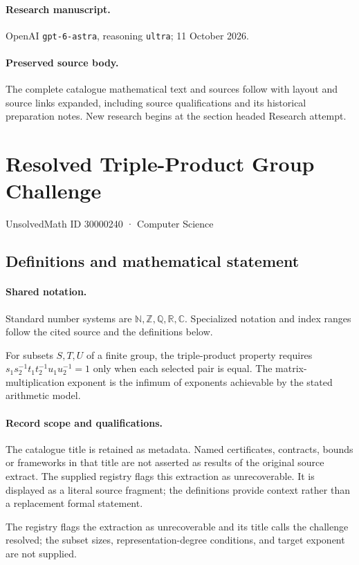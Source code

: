 \documentclass[11pt]{article}
\begin{document}
\paragraph{Research manuscript.} OpenAI \texttt{gpt-6-astra}, reasoning \texttt{ultra}; 11 October 2026.
\paragraph{Preserved source body.} The complete catalogue mathematical text and sources follow with layout and source links expanded, including source qualifications and its historical preparation notes. New research begins at the section headed Research attempt.

\section{Resolved Triple-Product Group Challenge}\label{30000240}
{\small UnsolvedMath ID 30000240 · Computer Science}
\subsection{Definitions and mathematical statement}

\paragraph{Shared notation.}Standard number systems are $\mathbb N,\mathbb Z,\mathbb Q,\mathbb R,\mathbb C$. Specialized notation and index ranges follow the cited source and the definitions below.


For subsets $S,T,U$ of a finite group, the triple-product property requires $s_1s_2^{-1}t_1t_2^{-1}u_1u_2^{-1}=1$ only when each selected pair is equal. The matrix-multiplication exponent is the infimum of exponents achievable by the stated arithmetic model.
\paragraph{Record scope and qualifications.}
The catalogue title is retained as metadata. Named certificates, contracts, bounds or frameworks in that title are not asserted as results of the original source extract.
The supplied registry flags this extraction as unrecoverable. It is displayed as a literal source fragment; the definitions provide context rather than a replacement formal statement.

The registry flags the extraction as unrecoverable and its title calls the challenge resolved; the subset sizes, representation-degree conditions, and target exponent are not supplied.
\end{document}
